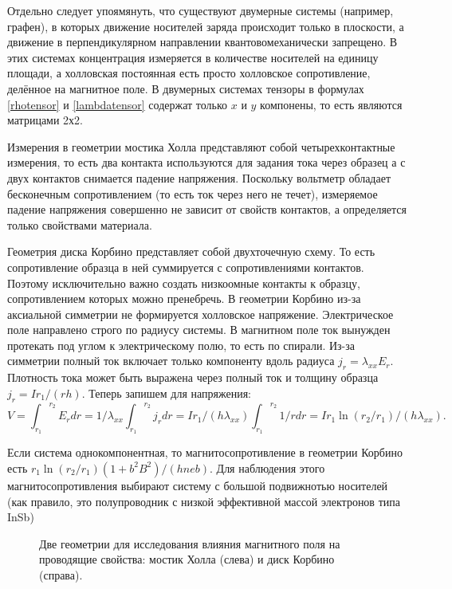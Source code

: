 \documentclass[a4paper,10pt,twoside]{article}
\begin{document}
Отдельно следует упоямянуть, что существуют двумерные системы (например, графен), в которых движение носителей заряда происходит только в плоскости, а движение в перпендикулярном направлении квантовомеханически запрещено. В этих системах концентрация измеряется в количестве носителей на единицу площади, а холловская постоянная есть просто холловское сопротивление, делённое на магнитное поле. В двумерных системах тензоры в формулах \ref{rhotensor} и \ref{lambdatensor} содержат только $x$ и $y$ компонены, то есть являются матрицами 2х2.

Измерения в геометрии мостика Холла представляют собой четырехконтактные измерения, то есть два контакта используются для задания тока через образец а с двух контактов снимается падение напряжения. Поскольку вольтметр обладает бесконечным сопротивлением (то есть ток через него не течет), измеряемое падение напряжения совершенно не зависит от свойств контактов, а определяется только свойствами материала.

Геометрия диска Корбино представляет собой двухточечную схему. То есть сопротивление образца в ней суммируется с сопротивлениями контактов. Поэтому исключительно важно создать низкоомные контакты к образцу, сопротивлением которых можно пренебречь. В геометрии Корбино из-за аксиальной симметрии не формируется холловское напряжение. Электрическое поле направлено строго по радиусу системы. В магнитном поле ток вынужден протекать под углом к электрическому полю, то есть по спирали. Из-за симметрии полный ток включает только компоненту вдоль радиуса $j_r=\lambda_{xx} E_r$. Плотность тока может быть выражена через полный ток и толщину образца $j_r=Ir_1/(rh)$. Теперь запишем для напряжения:
$$V={\int_{r_1}}^{r_2}E_r dr=1/\lambda_{xx}{\int_{r_1}}^{r_2}j_r dr=Ir_1/(h\lambda_{xx}){\int_{r_1}}^{r_2}1/r dr=Ir_1\ln(r_2/r_1)/(h\lambda_{xx}).$$

Если система однокомпонентная, то магнитосопротивление в геометрии Корбино есть $r_1\ln(r_2/r_1)(1+b^2B^2)/(hneb)$. Для наблюдения этого магнитосопротивления выбирают систему с большой подвижнотью носителей (как правило, это полупроводник с низкой эффективной массой электронов типа InSb)

\begin{figure}
\vspace{0.1 in}
\centerline{}
\begin{minipage}{3.2in}
\caption{Две геометрии для исследования влияния магнитного поля на проводящие свойства: мостик Холла (слева) и диск Корбино (справа).}
\label{fig2}
\end{minipage}
\vspace{0.4 in}
\end{figure}
\end{document}
